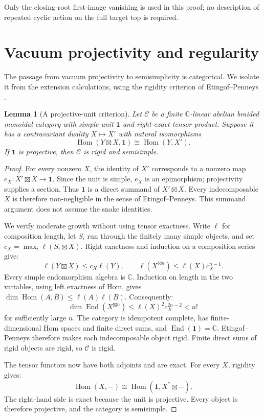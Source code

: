 \documentclass[11pt,a4paper]{article}
\numberwithin{equation}{section}
\newtheorem{lemma}[theorem]{Lemma}
\theoremstyle{definition}\newtheorem{definition}[theorem]{Definition}
\theoremstyle{remark}\newtheorem{remark}[theorem]{Remark}
\newcommand{\one}{\mathbf1}\newcommand{\B}{\mathcal B}\newcommand{\W}{W_N}
\begin{document}
Only the closing-root first-image vanishing is used in this proof;
no description of repeated cyclic action on the full target top is required.

\section{Vacuum projectivity and regularity}
\label{r:sec:projectivity}

The passage from vacuum projectivity to semisimplicity is categorical.
We isolate it from the extension calculations, using the rigidity
criterion of Etingof--Penneys \cite[Theorem 1.1]{ep}.

\begin{lemma}[A projective-unit criterion]\label{lem:projective-unit}
Let $\mathcal C$ be a finite $\mathbb C$-linear abelian braided
monoidal category with simple unit $\one$ and right-exact tensor
product. Suppose it has a contravariant duality $X\mapsto X'$ with
natural isomorphisms
\[
 \operatorname{Hom}(Y\boxtimes X,\one)
       \cong\operatorname{Hom}(Y,X').
\]
If $\one$ is projective, then $\mathcal C$ is rigid and semisimple.
\end{lemma}
\begin{proof}
For every nonzero $X$, the identity of $X'$ corresponds to a nonzero
map $e_X:X'\boxtimes X\to\one$. Since the unit is simple, $e_X$ is
an epimorphism; projectivity supplies a section. Thus $\one$ is a
direct summand of $X'\boxtimes X$. Every indecomposable $X$ is
therefore non-negligible in the sense of Etingof--Penneys. This
summand argument does not assume the snake identities.

We verify moderate growth without using tensor exactness. Write
$\ell$ for composition length, let $S_i$ run through the finitely
many simple objects, and set $c_X=\max_i\ell(S_i\boxtimes X)$.
Right exactness and induction on a composition series give:
\[
 \ell(Y\boxtimes X)\le c_X\ell(Y),\qquad
 \ell(X^{\boxtimes n})\le\ell(X)c_X^{n-1}.
\]
Every simple endomorphism algebra is $\mathbb C$. Induction on
length in the two variables, using left exactness of Hom, gives
$\dim\operatorname{Hom}(A,B)\le\ell(A)\ell(B)$. Consequently:
\[
 \dim\operatorname{End}(X^{\boxtimes n})
     \le\ell(X)^2c_X^{2n-2}<n!
\]
for sufficiently large $n$. The category is idempotent complete,
has finite-dimensional Hom spaces and finite direct sums, and
$\operatorname{End}(\one)=\mathbb C$. Etingof--Penneys therefore
makes each indecomposable object rigid. Finite direct sums of rigid
objects are rigid, so $\mathcal C$ is rigid.

The tensor functors now have both adjoints and are exact. For every
$X$, rigidity gives:
\[
 \operatorname{Hom}(X,-)
   \cong\operatorname{Hom}(\one,X^*\boxtimes-).
\]
The right-hand side is exact because the unit is projective. Every
object is therefore projective, and the category is semisimple.
\end{proof}
\end{document}
